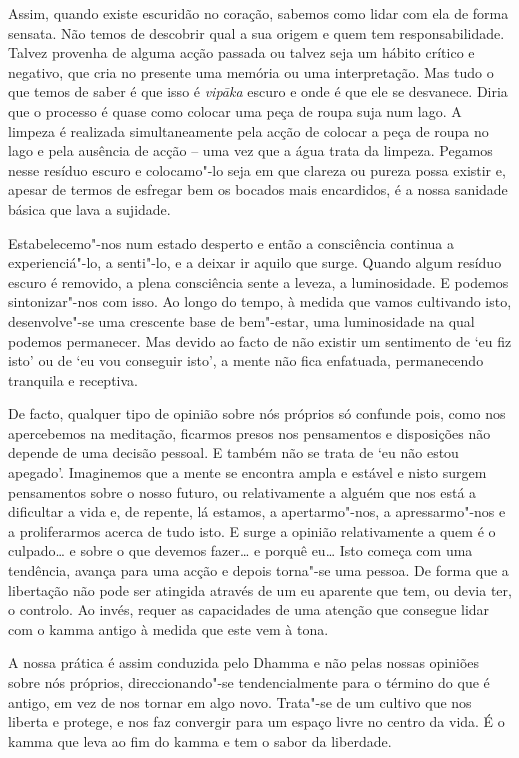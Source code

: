 Assim, quando existe escuridão no coração, sabemos como lidar com ela de forma
sensata. Não temos de descobrir qual a sua origem e quem tem responsabilidade.
Talvez provenha de alguma acção passada ou talvez seja um hábito crítico e
negativo, que cria no presente uma memória ou uma interpretação. Mas tudo o que
temos de saber é que isso é \emph{vipāka} escuro e onde é que ele se desvanece.
Diria que o processo é quase como colocar uma peça de roupa suja num lago. A
limpeza é realizada simultaneamente pela acção de colocar a peça de roupa no
lago e pela ausência de acção -- uma vez que a água trata da limpeza. Pegamos
nesse resíduo escuro e colocamo"-lo seja em que clareza ou pureza possa existir
e, apesar de termos de esfregar bem os bocados mais encardidos, é a nossa
sanidade básica que lava a sujidade.

Estabelecemo"-nos num estado desperto e então a consciência continua a
experienciá"-lo, a senti"-lo, e a deixar ir aquilo que surge. Quando algum resíduo
escuro é removido, a plena consciência sente a leveza, a luminosidade. E podemos
sintonizar"-nos com isso. Ao longo do tempo, à medida que vamos cultivando isto,
desenvolve"-se uma crescente base de bem"-estar, uma luminosidade na qual podemos
permanecer. Mas devido ao facto de não existir um sentimento de `eu fiz isto' ou
de `eu vou conseguir isto', a mente não fica enfatuada, permanecendo tranquila e
receptiva.

\enlargethispage{\baselineskip}

De facto, qualquer tipo de opinião sobre nós próprios só confunde pois, como nos
apercebemos na meditação, ficarmos presos nos pensamentos e disposições não
depende de uma decisão pessoal. E também não se trata de `eu não estou apegado'.
Imaginemos que a mente se encontra ampla e estável e nisto surgem pensamentos
sobre o nosso futuro, ou relativamente a alguém que nos está a dificultar a vida
e, de repente, lá estamos, a apertarmo"-nos, a apressarmo"-nos e a proliferarmos
acerca de tudo isto. E surge a opinião relativamente a quem é o culpado\ldots{}
e sobre o que devemos fazer\ldots{} e porquê eu\ldots{} Isto começa com uma
tendência, avança para uma acção e depois torna"-se uma pessoa. De forma que a
libertação não pode ser atingida através de um eu aparente que tem, ou devia
ter, o controlo. Ao invés, requer as capacidades de uma atenção que consegue
lidar com o kamma antigo à medida que este vem à tona.

A nossa prática é assim conduzida pelo Dhamma e não pelas nossas opiniões sobre
nós próprios, direccionando"-se tendencialmente para o término do que é antigo,
em vez de nos tornar em algo novo. Trata"-se de um cultivo que nos liberta e
protege, e nos faz convergir para um espaço livre no centro da vida. É o kamma
que leva ao fim do kamma e tem o sabor da liberdade.


